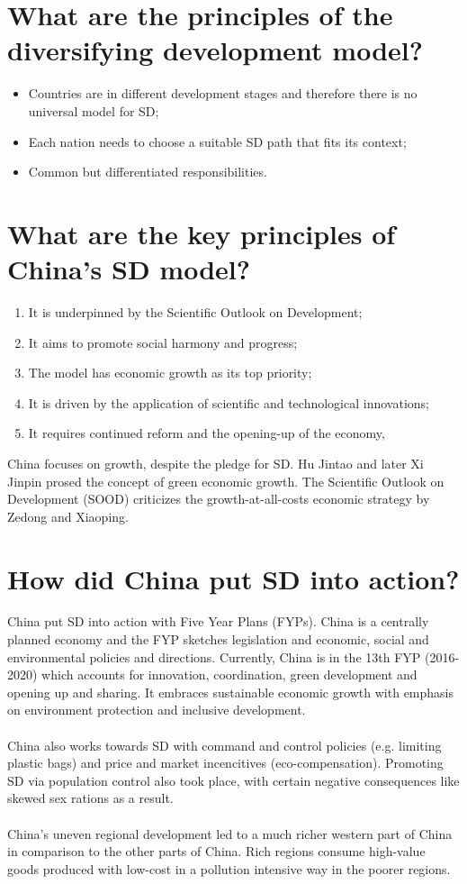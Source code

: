 \section{What are the principles of the diversifying development model?}
\begin{itemize}
\item Countries are in different development stages and therefore there is no universal model for SD;
\item Each nation needs to choose a suitable SD path that fits its context;
\item Common but differentiated responsibilities. 
\end{itemize}
 

\section{What are the key principles of China's SD model?}
\begin{enumerate}
\item It is underpinned by the Scientific Outlook on Development; 
\item It aims to promote social harmony and progress;
\item The model has economic growth as its top priority;
\item It is driven by the application of scientific and technological innovations;
\item It requires continued reform and the opening-up of the economy, 
\end{enumerate} 

China focuses on growth, despite the pledge for SD. Hu Jintao and later Xi Jinpin prosed the concept of green economic growth. The Scientific Outlook on Development (SOOD) criticizes the growth-at-all-costs economic strategy by Zedong and Xiaoping. 

\section{How did China put SD into action?}
China put SD into action with Five Year Plans (FYPs). China is a centrally planned economy and the FYP sketches legislation and economic, social and environmental policies and directions. Currently, China is in the 13th FYP (2016-2020) which accounts for innovation, coordination, green development and opening up and sharing. It embraces sustainable economic growth with emphasis on environment protection and inclusive development. \\
\\
China also works towards SD with command and control policies (e.g. limiting plastic bags) and price and market incencitives (eco-compensation). Promoting SD via population control also took place, with certain negative consequences like skewed sex rations as a result. \\
\\
China's uneven regional development led to a much richer western part of China in comparison to the other parts of China. Rich regions consume high-value goods produced with low-cost in a pollution intensive way in the poorer regions. 

